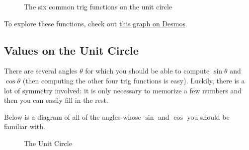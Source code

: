 \documentclass{article}
\theoremstyle{definition}
\theoremstyle{definition}
\begin{document}
\begin{figure}[h!]
{
}
\caption{The six common trig functions on the unit circle}
\label{6trig}
\end{figure}


To explore these functions, check out \href{https://www.desmos.com/calculator/fdr54f2jh3}{this graph on Desmos}.


\subsection{Values on the Unit Circle}

There are several angles $\theta$ for which you should be able to compute $\sin\theta$ and $\cos\theta$ (then computing the other four trig functions is easy). Luckily, there is a lot of symmetry involved: it is only necessary to memorize a few numbers and then you can easily fill in the rest.

Below is a diagram of all of the angles whose $\sin$ and $\cos$ you should be familiar with.

\begin{figure}[h!]
\label{the-unit-circle}
\centering
{}
\caption{The Unit Circle}
\end{figure}
\end{document}
